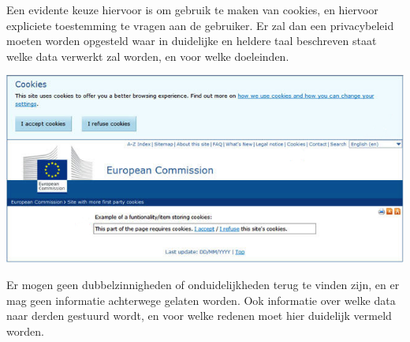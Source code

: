 Een evidente keuze hiervoor is om gebruik te maken van cookies, en hiervoor expliciete toestemming te vragen aan de gebruiker. Er zal dan een privacybeleid moeten worden opgesteld waar in duidelijke en heldere taal beschreven staat welke data verwerkt zal worden, en voor welke doeleinden. 


\includegraphics[width=\linewidth]{img/180321-EU-Cookie-Consent-Examples}

Er mogen geen dubbelzinnigheden of onduidelijkheden terug te vinden zijn, en er mag geen informatie achterwege gelaten worden. Ook informatie over welke data naar derden gestuurd wordt, en voor welke redenen moet hier duidelijk vermeld worden.





